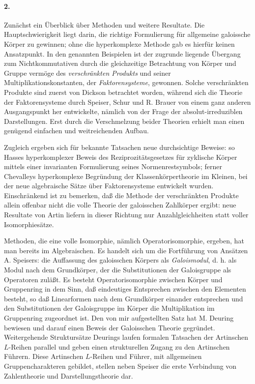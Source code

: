 \documentclass[11pt]{article}
\begin{document}
\paragraph{2.}
Zunächst ein Überblick über Methoden und weitere Resultate. Die Hauptschwierigkeit liegt darin, die richtige Formulierung für allgemeine galoissche Körper zu gewinnen; ohne die hyperkomplexe Methode gab es hierfür keinen Ansatzpunkt. In den genannten Beispielen ist der zugrunde liegende Übergang zum Nichtkommutativen durch die gleichzeitige Betrachtung von Körper und Gruppe vermöge des \emph{verschränkten Produkts} und seiner Multiplikationskonstanten, der \emph{Faktorensysteme}, gewonnen. Solche verschränkten Produkte sind zuerst von Dickson betrachtet worden, während sich die Theorie der Faktorensysteme durch Speiser, Schur und R. Brauer von einem ganz anderen Ausgangspunkt her entwickelte, nämlich von der Frage der absolut-irreduziblen Darstellungen. Erst durch die Verschmelzung beider Theorien erhielt man einen genügend einfachen und weitreichenden Aufbau.

Zugleich ergeben sich für bekannte Tatsachen neue durchsichtige Beweise: so Hasses hyperkomplexer Beweis des Reziprozitätsgesetzes für zyklische Körper mittels einer invarianten Formulierung seines Normenrestsymbols; ferner Chevalleys hyperkomplexe Begründung der Klassenkörpertheorie im Kleinen, bei der neue algebraische Sätze über Faktorensysteme entwickelt wurden. Einschränkend ist zu bemerken, daß die Methode der verschränkten Produkte allein offenbar nicht die volle Theorie der galoisschen Zahlkörper ergibt: neue Resultate von Artin liefern in dieser Richtung nur Anzahlgleichheiten statt voller Isomorphiesätze.

Methoden, die eine volle Isomorphie, nämlich Operatorisomorphie, ergeben, hat man bereits im Algebraischen. Es handelt sich um die Fortführung von Ansätzen A. Speisers: die Auffassung des galoisschen Körpers als \emph{Galoismodul}, d. h. als Modul nach dem Grundkörper, der die Substitutionen der Galoisgruppe als Operatoren zuläßt. Es besteht Operatorisomorphie zwischen Körper und Gruppenring in dem Sinn, daß eindeutiges Entsprechen zwischen den Elementen besteht, so daß Linearformen nach dem Grundkörper einander entsprechen und den Substitutionen der Galoisgruppe im Körper die Multiplikation im Gruppenring zugeordnet ist. Den von mir aufgestellten Satz hat M. Deuring bewiesen und darauf einen Beweis der Galoisschen Theorie gegründet. Weitergehende Struktursätze Deurings laufen formalen Tatsachen der Artinschen \(L\)-Reihen parallel und geben einen strukturellen Zugang zu den Artinschen Führern. Diese Artinschen \(L\)-Reihen und Führer, mit allgemeinen Gruppencharakteren gebildet, stellen neben Speiser die erste Verbindung von Zahlentheorie und Darstellungstheorie dar.
\end{document}
